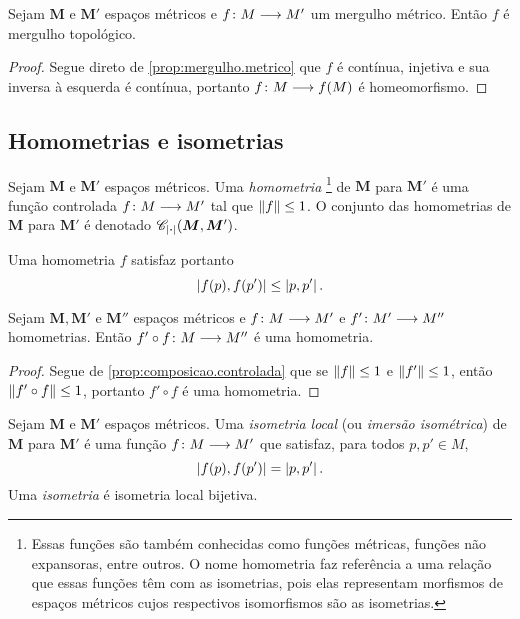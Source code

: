 \begin{proposition}
Sejam $\bm M$ e $\bm M'$ espaços métricos e ${f}\colon {M} \longrightarrow {M'}$ um mergulho métrico. Então $f$ é mergulho topológico.
\end{proposition}
\begin{proof}
Segue direto de \ref{prop:mergulho.metrico} que $f$ é contínua, injetiva e sua inversa à esquerda é contínua, portanto ${f}\colon {M} \longrightarrow {f(M)}$ é homeomorfismo.
\end{proof}

\subsection{Homometrias e isometrias}

\begin{definition}
Sejam $\bm M$ e $\bm M'$ espaços métricos. Uma \emph{homometria}%
	\footnote{Essas funções são também conhecidas como funções métricas, funções não expansoras, entre outros. O nome homometria faz referência a uma relação que essas funções têm com as isometrias, pois elas representam morfismos de espaços métricos cujos respectivos isomorfismos são as isometrias.} %
de $\bm M$ para $\bm M'$ é uma função controlada ${f}\colon {M} \longrightarrow {M'}$ tal que $\left\Vert{f}\right\Vert \leq 1$.
O conjunto das homometrias de $\bm M$ para $\bm M'$ é denotado $\mathscr{C}_{\vert \bm{\cdot} \vert}(\bm M,\bm M')$.
\end{definition}

Uma homometria $f$ satisfaz portanto
	\begin{equation*}
	\left\vert{f(p)},{f(p')}\right\vert \leq \left\vert{p},{p'}\right\vert.
	\end{equation*}

\begin{proposition}
\label{prop:composicao.homometria}
Sejam $\bm M, \bm M'$ e $\bm M''$ espaços métricos e ${f}\colon {M} \longrightarrow {M'}$ e ${f'}\colon {M'} \longrightarrow {M''}$ homometrias. Então ${f' \circ f}\colon {M} \longrightarrow {M''}$ é uma homometria.
\end{proposition}
\begin{proof}
Segue de \ref{prop:composicao.controlada} que se $\left\Vert{f}\right\Vert \leq 1$ e $\left\Vert{f'}\right\Vert \leq 1$, então $\left\Vert{f' \circ f}\right\Vert \leq 1$, portanto $f' \circ f$ é uma homometria.
\end{proof}

\begin{definition}
Sejam $\bm{M}$ e $\bm{M'}$ espaços métricos. Uma \emph{isometria local} (ou \emph{imersão isométrica}) de $\bm{M}$ para $\bm{M'}$ é uma função ${f}\colon {M} \longrightarrow {M'}$ que satisfaz, para todos $p,p' \in M$,
	\begin{equation*}
	\left\vert{f(p)},{f(p')}\right\vert = \left\vert{p},{p'}\right\vert.
	\end{equation*}
Uma \emph{isometria} é isometria local bijetiva.
\end{definition}

